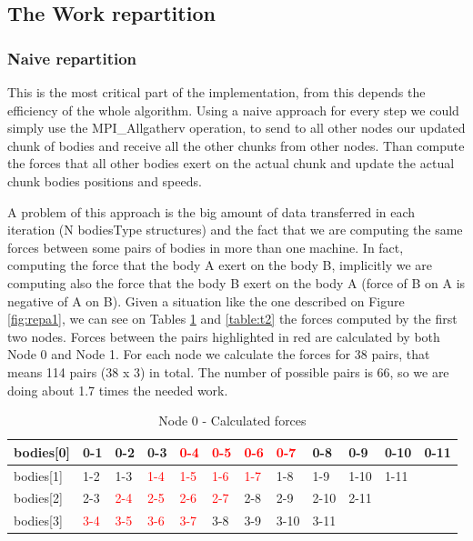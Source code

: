 \documentclass[a4paper]{article}
\begin{document}
\subsection{The Work repartition}
\label{sec:work_rep}

\subsubsection{Naive repartition}
\label{sec:naive_rep}

This is the most critical part of the implementation, from this depends the efficiency of the whole algorithm. 
Using a naive approach for every step we could simply use the MPI\_Allgatherv operation, to send to all other nodes our updated chunk of bodies and receive all the other chunks from other nodes. Than compute the forces that all other bodies exert on the actual chunk and update the actual chunk bodies positions and speeds. 

A problem of this approach is the big amount of data transferred in each iteration (N bodiesType structures) and the fact that we are computing the same forces between some pairs of bodies in more than one machine. In fact, computing the force that the body A exert on the body B, implicitly we are computing also the force that the body B exert on the body A (force of B on A is negative of A on B). Given a situation like the one described on Figure \ref{fig:repa1}, we can see on Tables \ref{table:t1} and \ref{table:t2} the forces computed by the first two nodes. Forces between the pairs highlighted in red are calculated by both Node 0 and Node 1. For each node we calculate the forces for 38 pairs, that means 114 pairs (38 x 3) in total. The number of possible pairs is 66, so we are doing about 1.7 times the needed work. \\

\begin{table}[]
\centering
\caption{Node 0 - Calculated forces}
\label{table:t1}
\begin{tabular}{l|lllllllllll}
bodies{[}0{]} & 0-1 & 0-2 & 0-3 & \textcolor{red}{0-4} & \textcolor{red}{0-5} & \textcolor{red}{0-6} & \textcolor{red}{0-7}  & 0-8  & 0-9  & 0-10 & 0-11 \\ \hline
bodies{[}1{]} & 1-2 & 1-3 & \textcolor{red}{1-4} & \textcolor{red}{1-5} & \textcolor{red}{1-6} & \textcolor{red}{1-7} & 1-8  & 1-9  & 1-10 & 1-11 &      \\ \hline
bodies{[}2{]} & 2-3 & \textcolor{red}{2-4} & \textcolor{red}{2-5} & \textcolor{red}{2-6} & \textcolor{red}{2-7} & 2-8 & 2-9  & 2-10 & 2-11 &      &      \\ \hline
bodies{[}3{]} & \textcolor{red}{3-4} & \textcolor{red}{3-5} & \textcolor{red}{3-6} & \textcolor{red}{3-7} & 3-8 & 3-9 & 3-10 & 3-11 &      &      &   
\end{tabular}
\end{table}
\end{document}
